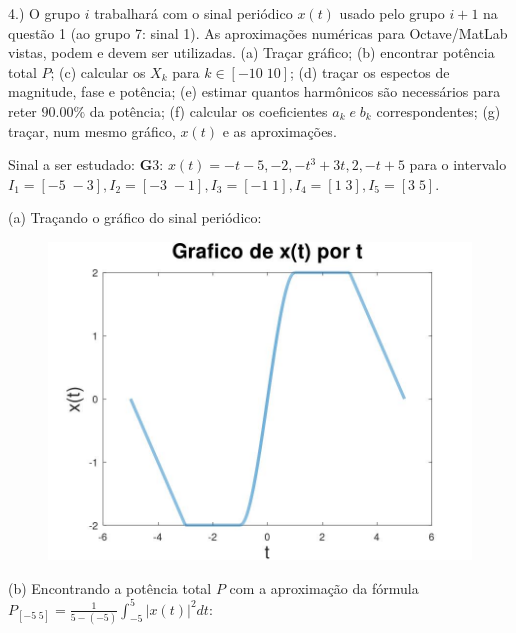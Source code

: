 \documentclass{article}
\begin{document}
\vspace{\baselineskip}

4.) O grupo $i$ trabalhará com o sinal periódico $x(t)$ usado pelo grupo $i + 1$ na questão 1 (ao grupo 7: sinal 1). As aproximações numéricas para Octave/MatLab vistas, podem e devem ser utilizadas.
(a) Traçar gráfico;
(b) encontrar potência total $P$;
(c) calcular os $X_{k}$ para $k \in [-10\;10]$;
(d) traçar os espectos de magnitude, fase e potência;
(e) estimar quantos harmônicos são necessários para reter $90.00\%$ da potência;
(f) calcular os coeficientes $a_{k}\;e\;b_{k}$ correspondentes;
(g) traçar, num mesmo gráfico, $x(t)$ e as aproximações.

Sinal a ser estudado: {\textbf G3}: $x(t) = -t - 5, -2, -t^3 + 3t, 2, -t + 5$ para o intervalo $I_{1} = [-5\;-3], I_{2} = [-3\;-1], I_{3} = [-1\;1], I_{4} = [1\;3], I_{5} = [3\;5]$.

\vspace{\baselineskip}

(a) Traçando o gráfico do sinal periódico:

\begin{figure}[h!]
    \includegraphics[scale=0.4]{plot4a}
    \centering
\end{figure}

\vspace{\baselineskip}

(b) Encontrando a potência total $P$ com a aproximação da fórmula $P_{[-5\;5]} = \frac{1}{5 - (-5)} \int_{-5}^{5} |x(t)|^2 dt $:

\vspace{\baselineskip}
\end{document}
